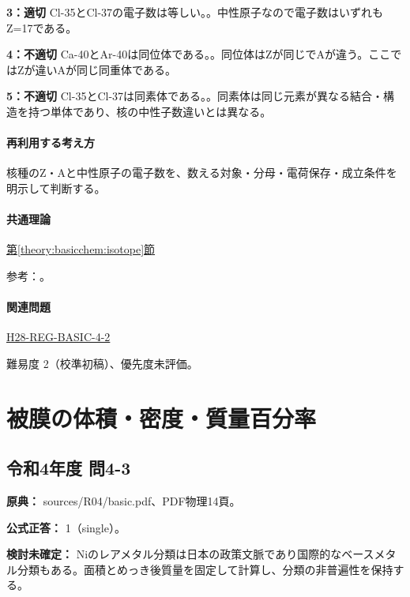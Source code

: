 \noindent\textbf{3：適切} Cl-35とCl-37の電子数は等しい。。中性原子なので電子数はいずれもZ=\allowbreak{}17である。\par

\noindent\textbf{4：不適切} Ca-40とAr-40は同位体である。。同位体はZが同じでAが違う。ここではZが違いAが同じ同重体である。\par

\noindent\textbf{5：不適切} Cl-35とCl-37は同素体である。。同素体は同じ元素が異なる結合・構造を持つ単体であり、核の中性子数違いとは異なる。\par

\paragraph{再利用する考え方} 核種のZ・Aと中性原子の電子数を、数える対象・分母・電荷保存・成立条件を明示して判断する。

\paragraph{共通理論} \hyperref[theory:basicchem:isotope]{第\ref*{theory:basicchem:isotope}節}

\par 参考：\cite{iupac_isotopes}。

\paragraph{関連問題} \hyperref[q:h28-reg-basic-4-2]{H28-REG-BASIC-4-2}

\par 難易度 2（校準初稿）、優先度未評価。

\section{被膜の体積・密度・質量百分率}

\subsection{令和4年度 問4-3}
\label{q:r04-reg-basic-4-3}

\noindent\textbf{原典：} sources/R04/basic.pdf、PDF物理14頁。

\textbf{公式正答：} 1（single）。

\par\textbf{検討未確定：} Niのレアメタル分類は日本の政策文脈であり国際的なベースメタル分類もある。面積とめっき後質量を固定して計算し、分類の非普遍性を保持する。

